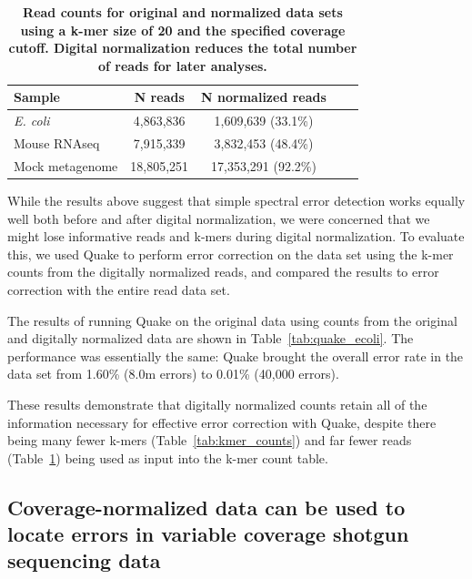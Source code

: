 \documentclass{article}
\begin{document}

\begin{table}
\centering
\begin{tabular}{|l|c|c|c|c|}
\hline
Sample              & N reads    & N normalized reads \\
\hline
{\em E. coli}       & 4,863,836   & 1,609,639 (33.1\%) \\
Mouse RNAseq        & 7,915,339   & 3,832,453 (48.4\%) \\
Mock metagenome     & 18,805,251  & 17,353,291 (92.2\%) \\

\hline
\end{tabular}

\caption{{\bf Read counts for original and normalized data sets using
    a k-mer size of 20 and the specified coverage cutoff. Digital
    normalization reduces the total number of reads for later analyses.}}
\label{tab:read_counts}
\end{table}

While the results above suggest that simple spectral error detection
works equally well both before and after digital normalization, we
were concerned that we might lose informative reads and k-mers during
digital normalization.  To evaluate this, we used Quake \cite{quake}
to perform error correction on the data set using the k-mer counts
from the digitally normalized reads, and compared the results to error
correction with the entire read data set.

The results of running Quake on the original data using counts from
the original and digitally normalized data are shown in
Table~\ref{tab:quake_ecoli}.  The performance was essentially the
same: Quake brought the overall error rate in the data set from 1.60\%
(8.0m errors) to 0.01\% (40,000 errors).

These results demonstrate that digitally normalized counts retain all
of the information necessary for effective error correction with
Quake, despite there being many fewer k-mers
(Table~\ref{tab:kmer_counts}) and far fewer reads
(Table~\ref{tab:read_counts}) being used as input into the k-mer count
table.

\subsection{Coverage-normalized data can be used to locate errors in variable
coverage shotgun sequencing data}
\end{document}
